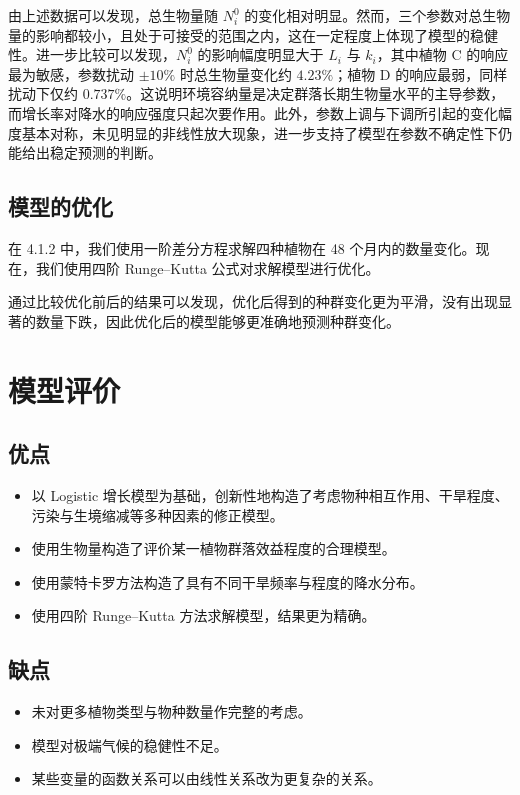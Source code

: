 \documentclass[11pt,a4paper]{ctexart}
\begin{document}
由上述数据可以发现，总生物量随 $N_i^{0}$ 的变化相对明显。然而，三个参数对总生物量的影响都较小，且处于可接受的范围之内，这在一定程度上体现了模型的稳健性。进一步比较可以发现，$N_i^{0}$ 的影响幅度明显大于 $L_i$ 与 $k_i$，其中植物 C 的响应最为敏感，参数扰动 $\pm10\%$ 时总生物量变化约 $4.23\%$；植物 D 的响应最弱，同样扰动下仅约 $0.737\%$。这说明环境容纳量是决定群落长期生物量水平的主导参数，而增长率对降水的响应强度只起次要作用。此外，参数上调与下调所引起的变化幅度基本对称，未见明显的非线性放大现象，进一步支持了模型在参数不确定性下仍能给出稳定预测的判断。

\subsection{模型的优化}

在 4.1.2 中，我们使用一阶差分方程求解四种植物在 48 个月内的数量变化。现在，我们使用四阶 Runge--Kutta 公式对求解模型进行优化。

通过比较优化前后的结果可以发现，优化后得到的种群变化更为平滑，没有出现显著的数量下跌，因此优化后的模型能够更准确地预测种群变化。

\section{模型评价}

\subsection{优点}

\begin{itemize}
\item 以 Logistic 增长模型为基础，创新性地构造了考虑物种相互作用、干旱程度、污染与生境缩减等多种因素的修正模型。
\item 使用生物量构造了评价某一植物群落效益程度的合理模型。
\item 使用蒙特卡罗方法构造了具有不同干旱频率与程度的降水分布。
\item 使用四阶 Runge--Kutta 方法求解模型，结果更为精确。
\end{itemize}

\subsection{缺点}

\begin{itemize}
\item 未对更多植物类型与物种数量作完整的考虑。
\item 模型对极端气候的稳健性不足。
\item 某些变量的函数关系可以由线性关系改为更复杂的关系。
\end{itemize}
\end{document}
